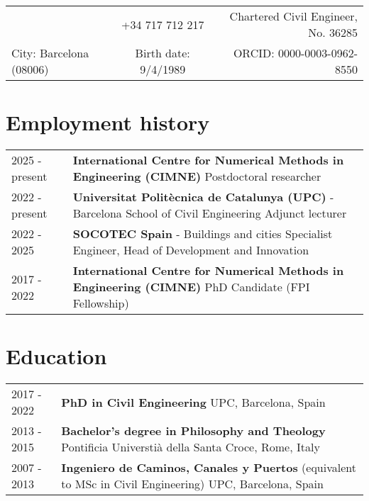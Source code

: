 \documentclass[12pt]{article}
\author{Miguel Masó, PhD}
\begin{document}
\maketitle
\begin{tabularx}{\linewidth}{lCr}
 &
+34 717 712 217 &
Chartered Civil Engineer, No. 36285\\[-.2em]
City: Barcelona (08006) &
Birth date: 9/4/1989 &
ORCID: 0000-0003-0962-8550    
\end{tabularx}


\section{Employment history}
\begin{tabularx}{\linewidth}{lX}
    2025 - \small{present} &
    \textbf{International Centre for Numerical Methods in Engineering (CIMNE)} \newline
    Postdoctoral researcher \\

    2022 - \small{present} &
    \textbf{Universitat Politècnica de Catalunya (UPC)} - Barcelona School of Civil Engineering \newline
    Adjunct lecturer \\ 

    2022 - 2025 &
    \textbf{SOCOTEC Spain} - Buildings and cities \newline
    Specialist Engineer, Head of Development and Innovation \\

    2017 - 2022 &
    \textbf{International Centre for Numerical Methods in Engineering (CIMNE)} \newline
    PhD Candidate (FPI Fellowship) \\
\end{tabularx}


\section{Education}
\begin{tabularx}{\linewidth}{lX}
    2017 - 2022 &
    \textbf{PhD in Civil Engineering} \newline
    UPC, Barcelona, Spain \\

    2013 - 2015 &
    \textbf{Bachelor's degree in Philosophy and Theology} \newline
    Pontificia Universtià della Santa Croce, Rome, Italy \\

    2007 - 2013 &
    \textbf{Ingeniero de Caminos, Canales y Puertos} (equivalent to MSc in Civil Engineering) \newline
    UPC, Barcelona, Spain \\
\end{tabularx}
\end{document}
